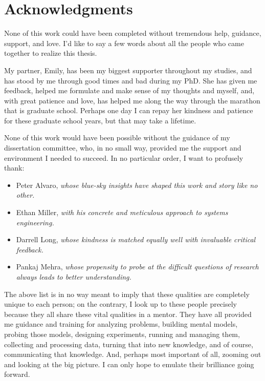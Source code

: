 

\begingroup
\let\clearpage\relax
\let\cleardoublepage\relax
\let\cleardoublepage\relax
\chapter*{Acknowledgments}

None of this work could have been completed without tremendous help, guidance, support, and love. I'd like to say a few
words about all the people who came together to realize this thesis.

My partner, Emily, has been my biggest supporter throughout my studies, and has stood by me through good times and bad
during my PhD. She has given me feedback, helped me formulate and make sense of my thoughts and myself, and, with great
patience and love, has helped me along the way through the marathon that is graduate school. Perhaps one day I can repay
her kindness and patience for these graduate school years, but that may take a lifetime.

None of this work would have been possible without the guidance of my dissertation committee, who, in no small way,
provided me the support and environment I needed to succeed. In no particular order, I want to profusely thank:

\begin{itemize}
    \item Peter Alvaro, \emph{whose blue-sky insights have shaped this work and story like no other.}
    \item Ethan Miller, \emph{with his concrete and meticulous approach to systems engineering.}
    \item Darrell Long, \emph{whose kindness is matched equally well with invaluable critical feedback.}
    \item Pankaj Mehra, \emph{whose propensity to probe at the difficult questions of research always leads to better understanding.}
\end{itemize}

The above list is in no way meant to imply that these qualities are completely unique to each person; on the contrary,
I look up to these people precisely because they all share these vital qualities in a mentor. They have all provided me
guidance and training for analyzing problems, building mental models, probing those models, designing experiments,
running and managing them, collecting and processing data, turning that into new knowledge, and of course, communicating
that knowledge. And, perhaps most important of all, zooming out and looking at the big picture. I can only hope to
emulate their brilliance going forward.


